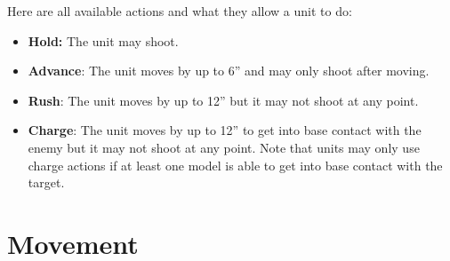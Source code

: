 \documentclass[9pt, a4paper, bookmarks=false]{extarticle}            %
\begin{document}
\begin{multicols}{2}
Here are all available actions and what they allow a unit to do:

\begin{itemize}
  \item \textbf{Hold:} The unit may shoot.
  \item \textbf{Advance}: The unit moves by up to 6” and may only shoot after moving.
  \item \textbf{Rush}: The unit moves by up to 12” but it may not shoot at any point.
  \item \textbf{Charge}: The unit moves by up to 12” to get into base contact with the enemy but it may not shoot at any point. Note that units may only use charge actions if at least one model is able to get into base contact with the target.
\end{itemize}

\vfill

\columnbreak

\vfill\null

\end{multicols}


\newpage



\section{Movement}
\end{document}
